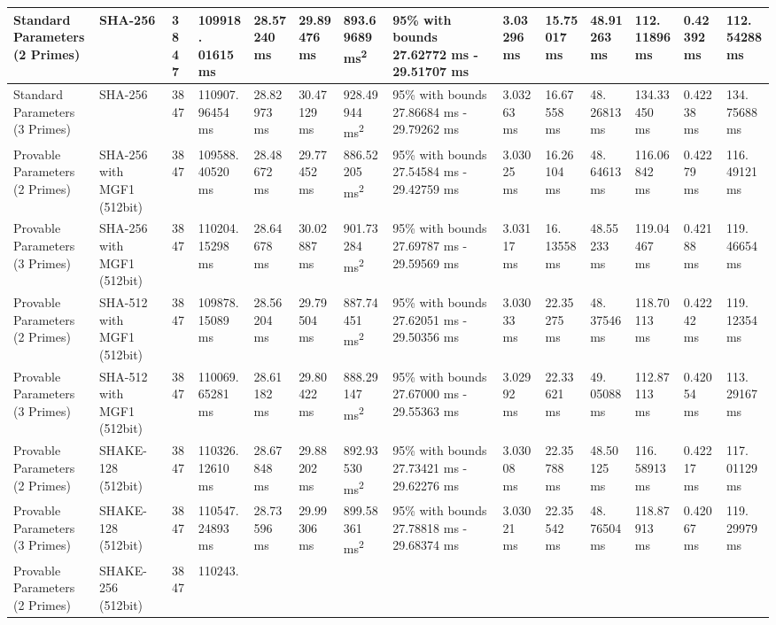 \documentclass[]{final_report}
\theoremstyle{definition}
\begin{document}
\begin{landscape}
\begin{longtable}{|p{2.3cm}|p{1.8cm}|p{1.0cm}|p{1.7cm}|p{1.4cm}|p{1.5cm}|p{1.8cm}|p{1.5cm}|p{1.2cm}|p{1.5cm}|p{1.3cm}|p{1.2cm}|p{1.3cm}|p{1.3cm}|}
Standard Parameters (2 Primes) & SHA-256 & 3847 & 109918.
01615 ms & 28.57240 ms & 29.89476 ms & 893.69689 ms\textsuperscript{2}  & 95\% with bounds 27.62772 ms - 29.51707 ms & 3.03296 ms & 15.75017 ms & 48.91263 ms & 112.
11896 ms & 0.42392 ms & 112.
54288 ms \\
\hline
Standard Parameters (3 Primes) & SHA-256 & 3847 & 110907.
96454 ms & 28.82973 ms & 30.47129 ms & 928.49944 ms\textsuperscript{2}  & 95\% with bounds 27.86684 ms - 29.79262 ms & 3.03263 ms & 16.67558 ms & 48.
26813 ms & 134.33450 ms & 0.42238 ms & 134.
75688 ms \\
\hline
Provable Parameters (2 Primes) & SHA-256 with MGF1 (512bit) & 3847 & 109588.
40520 ms & 28.48672 ms & 29.77452 ms & 886.52205 ms\textsuperscript{2}  & 95\% with bounds 27.54584 ms - 29.42759 ms & 3.03025 ms & 16.26104 ms & 48.
64613 ms & 116.06842 ms & 0.42279 ms & 116.
49121 ms \\
\hline
Provable Parameters (3 Primes) & SHA-256 with MGF1 (512bit) & 3847 & 110204.
15298 ms & 28.64678 ms & 30.02887 ms & 901.73284 ms\textsuperscript{2}  & 95\% with bounds 27.69787 ms - 29.59569 ms & 3.03117 ms & 16.
13558 ms & 48.55233 ms & 119.04467 ms & 0.42188 ms & 119.
46654 ms \\
\hline
Provable Parameters (2 Primes) & SHA-512 with MGF1 (512bit) & 3847 & 109878.
15089 ms & 28.56204 ms & 29.79504 ms & 887.74451 ms\textsuperscript{2}  & 95\% with bounds 27.62051 ms - 29.50356 ms & 3.03033 ms & 22.35275 ms & 48.
37546 ms & 118.70113 ms & 0.42242 ms & 119.
12354 ms \\
\hline
Provable Parameters (3 Primes) & SHA-512 with MGF1 (512bit) & 3847 & 110069.
65281 ms & 28.61182 ms & 29.80422 ms & 888.29147 ms\textsuperscript{2}  & 95\% with bounds 27.67000 ms - 29.55363 ms & 3.02992 ms & 22.33621 ms & 49.
05088 ms & 112.87113 ms & 0.42054 ms & 113.
29167 ms \\
\hline
Provable Parameters (2 Primes) & SHAKE-128 (512bit) & 3847 & 110326.
12610 ms & 28.67848 ms & 29.88202 ms & 892.93530 ms\textsuperscript{2}  & 95\% with bounds 27.73421 ms - 29.62276 ms & 3.03008 ms & 22.35788 ms & 48.50125 ms & 116.
58913 ms & 0.42217 ms & 117.
01129 ms \\
\hline
Provable Parameters (3 Primes) & SHAKE-128 (512bit) & 3847 & 110547.
24893 ms & 28.73596 ms & 29.99306 ms & 899.58361 ms\textsuperscript{2}  & 95\% with bounds 27.78818 ms - 29.68374 ms & 3.03021 ms & 22.35542 ms & 48.
76504 ms & 118.87913 ms & 0.42067 ms & 119.
29979 ms \\
\hline
Provable Parameters (2 Primes) & SHAKE-256 (512bit) & 3847 & 110243.

\end{longtable}
\end{landscape}
\end{document}

